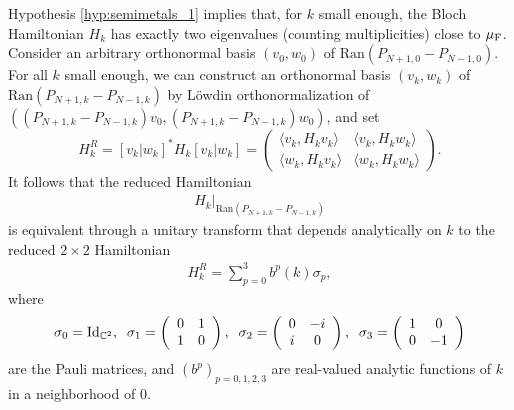 \documentclass[a4paper,11pt]{article}
\newcommand{\Ran}{\mathrm{Ran}}
\theoremstyle{plain}
\theoremstyle{remark}
\def\C{{\mathbb C}}
\begin{document}
Hypothesis \eqref{hyp:semimetals_1} implies that, for $k$ small
enough, the Bloch Hamiltonian $H_k$ has exactly two eigenvalues
(counting multiplicities) close to $\mu_{\rm F}$. Consider an
arbitrary orthonormal basis $(v_0,w_0)$ of
$\Ran(P_{N+1,0} - P_{N-1,0})$. For all $k$ small
enough, we can construct an orthonormal basis $(v_k,w_k)$ of
$\Ran(P_{N+1,k} - P_{N-1,k})$ by L\"owdin
orthonormalization of
$((P_{N+1,k} - P_{N-1,k})v_0,(P_{N+1,k} -
P_{N-1,k})w_0)$, and set
$$
H_k^{R} = [v_{k} | w_{k}]^{*}
H_k[v_{k} | w_{k}] = \left( \begin{array}{cc} \langle v_k, H_k v_k \rangle &  \langle v_k, H_k w_k \rangle \\
\langle w_k, H_k v_k \rangle &  \langle w_k, H_k w_k \rangle \end{array} \right).
$$
It follows that the reduced Hamiltonian
\begin{align*}
  H_k\Big|_{\Ran(P_{N+1,k} - P_{N-1,k}) }
\end{align*}
is equivalent through a unitary transform that depends analytically on $k$
to the reduced $2 \times 2$ Hamiltonian
\begin{align}
  \label{eq:Hmatk}
  H_k^{R} = \sum_{p=0}^3 b^{p}(k) \sigma_{p},
\end{align}
where $$\sigma_{0} = {\rm Id}_{\C^{2}}, \;\; \sigma_{1}=\left( \begin{array}{cc} 0 & 1 \\ 1 & 0 \end{array} \right), \;\;\sigma_{2}=\left( \begin{array}{cc} 0 & -i \\ i & 0 \end{array} \right), \;\;\sigma_{3}=\left( \begin{array}{cc} 1 & 0 \\ 0 & -1 \end{array} \right)$$
are the Pauli matrices, and $(b^{p})_{p=0,1,2,3}$ are real-valued
analytic functions of $k$ in a neighborhood of $0$.
\end{document}
